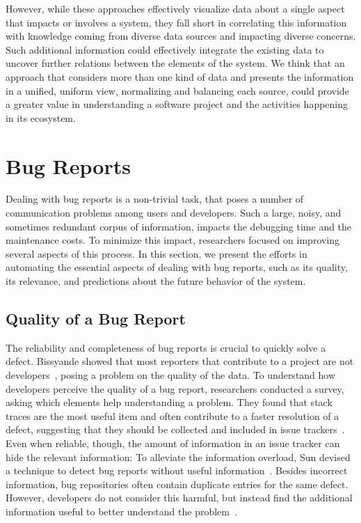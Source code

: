 However, while these approaches effectively visualize data about a single aspect that impacts or involves a system, they fall short in correlating this information with knowledge coming from diverse data sources and impacting diverse concerns.
Such additional information could effectively integrate the existing data to uncover further relations between the elements of the system.
We think that an approach that considers more than one kind of data and presents the information in a unified, uniform view, normalizing and balancing each source, could provide a greater value in understanding a software project and the activities happening in its ecosystem.



\section{Bug Reports}\label{sec:related-reports}

Dealing with bug reports is a non-trivial task, that poses a number of communication problems among users and developers.
Such a large, noisy, and sometimes redundant corpus of information, impacts the debugging time and the maintenance costs.
To minimize this impact, researchers focused on improving several aspects of this process.
In this section, we present the efforts in automating the essential aspects of dealing with bug reports, such as its quality, its relevance, and predictions about the future behavior of the system.

\subsection{Quality of a Bug Report}

The reliability and completeness of bug reports is crucial to quickly solve a defect.
Bissyande \etal showed that most reporters that contribute to a project are not developers~\cite{Biss2013b}, posing a problem on the quality of the data.
To understand how developers perceive the quality of a bug report, researchers conducted a survey, asking which elements help understanding a problem.
They found that stack traces are the most useful item and often contribute to a faster resolution of a defect, suggesting that they should be collected and included in issue trackers~\cite{Zimm2010a,Bett2007,Schr2010a}.
Even when reliable, though, the amount of information in an issue tracker can hide the relevant information: To alleviate the information overload, Sun devised a technique to detect bug reports without useful information~\cite{Sun2011}.
Besides incorrect information, bug repositories often contain duplicate entries for the same defect.
However, developers do not consider this harmful, but instead find the additional information useful to better understand the problem~\cite{Bett2008a}.

